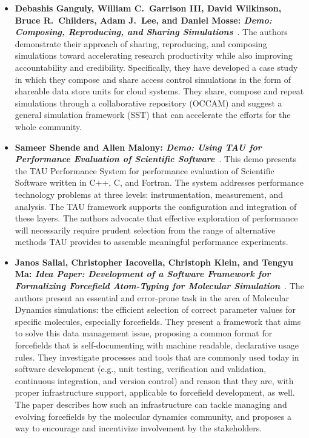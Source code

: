 \documentclass[11pt, oneside]{amsart}
\begin{document}
\begin{itemize}
\item \textbf{Debashis Ganguly, William C.\ Garrison III, David Wilkinson,
Bruce R.\ Childers, Adam J.\ Lee, and Daniel Mosse: \emph{Demo: Composing,
Reproducing, and Sharing Simulations}}~\cite{Ganguly:2016ws}.
The authors demonstrate their approach of sharing,
reproducing, and composing simulations toward accelerating
research productivity while also improving accountability and
credibility. Specifically, they have developed a case study in
which they compose and share access control simulations in the
form of shareable data store units for cloud systems. They share, compose
and repeat simulations  through a collaborative repository
(OCCAM) and suggest a general simulation framework (SST) that can
accelerate the efforts for the whole community.

\item \textbf{Sameer Shende and Allen Malony: \emph{Demo: Using TAU for
Performance Evaluation of Scientific Software}}~\cite{Shende:2016ws}.
This demo presents the  TAU Performance System for performance evaluation of Scientific
Software written in C++, C, and Fortran. The system addresses performance
technology problems  at three levels: instrumentation,
measurement, and analysis. The TAU framework supports the
configuration and integration of these layers. The authors advocate that effective
exploration of performance will necessarily
require prudent selection from the range of alternative methods TAU provides
to  assemble meaningful performance experiments.

\item \textbf{Janos Sallai, Christopher Iacovella, Christoph Klein, and Tengyu Ma:
\emph{Idea Paper: Development of a Software Framework for Formalizing Forcefield
Atom-Typing for Molecular Simulation}}~\cite{Sallai:2016ws}.
The authors present an essential and error-prone task in the area of Molecular
Dynamics simulations: the efficient selection of correct parameter values for
specific molecules, especially forcefields. They present a framework that
aims to solve this data management issue, proposing a common format for
forcefields that is self-documenting with machine readable,
declarative usage rules. They investigate processes and tools
that are commonly used today in software development (e.g.,
unit testing, verification and validation, continuous integration,
and version control) and reason that they are, with proper infrastructure
support, applicable to forcefield development, as well. The
paper describes how such an infrastructure can tackle managing and evolving
forcefields by the molecular dynamics community, and
proposes a way to encourage and incentivize involvement
by the stakeholders.


\end{itemize}
\end{document}
